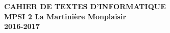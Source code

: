 \documentclass[12pt,a4paper]{article}
\begin{document}
\begin{center}
\Large\bf CAHIER DE TEXTES D'INFORMATIQUE\\
MPSI 2 La Martinière Monplaisir\\ 2016-2017
\end{center}
\vspace{1cm}
\vspace{.4cm}\\

% 
% 
%  
%  
% 
% 
% 
% 
\end{document}
